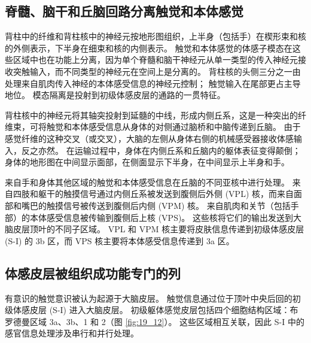 \subsection{脊髓、脑干和丘脑回路分离触觉和本体感觉}
背柱中的纤维和背柱核中的神经元按地形图组织，上半身（包括手）在楔形束和核的外侧表示，下半身在细束和核的内侧表示。 
触觉和本体感觉的体感子模态在这些区域中也在功能上分离，因为单个脊髓和脑干神经元从单一类型的传入神经元接收突触输入，而不同类型的神经元在空间上是分离的。 
背柱核的头侧三分之一由处理来自肌肉传入神经的本体感受信息的神经元控制； 触觉输入在尾部更占主导地位。 
模态隔离是投射到初级体感皮层的通路的一贯特征。


背柱核中的神经元将其轴突投射到延髓的中线，形成内侧丘系，这是一种突出的纤维束，可将触觉和本体感受信息从身体的对侧通过脑桥和中脑传递到丘脑。 
由于感觉纤维的这种交叉（或交叉），大脑的左侧从身体右侧的机械感受器接收体感输入，反之亦然。 
在运输过程中，身体在内侧丘系和丘脑内的躯体表征变得颠倒； 身体的地形图在中间显示面部，在侧面显示下半身，在中间显示上半身和手。


来自手和身体其他区域的触觉和本体感受信息在丘脑的不同亚核中进行处理。 
来自四肢和躯干的触摸信号通过内侧丘系被发送到腹侧后外侧 (VPL) 核，而来自面部和嘴巴的触摸信号被传送到腹侧后内侧 (VPM) 核。 
来自肌肉和关节（包括手部）的本体感受信息被传输到腹侧后上核 (VPS)。 
这些核将它们的输出发送到大脑皮层顶叶的不同子区域。 
VPL 和 VPM 核主要将皮肤信息传递到初级体感皮层 (S-I) 的 3b 区，而 VPS 核主要将本体感受信息传递到 3a 区。


\subsection{体感皮层被组织成功能专门的列}
有意识的触觉意识被认为起源于大脑皮层。 触觉信息通过位于顶叶中央后回的初级体感皮层 (S-I) 进入大脑皮层。 
初级躯体感觉皮层包括四个细胞结构区域：布罗德曼区域 3a、3b、1 和 2（图 \ref{fig:19_12}）。 
这些区域相互关联，因此 S-I 中的感官信息处理涉及串行和并行处理。

